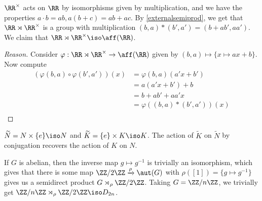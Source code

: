 \begin{ex}
$\RR^{\times}$ acts on $\RR$ by isomorphisms given by multiplication,
and we have the properties $a \cdot b = ab, a(b + c) = ab + ac$. By
\ref{externalsemiprod}, we get that $\RR \rtimes \RR^\times$ is a group
with multiplication $(b, a) * (b', a') = (b + ab', aa')$. We claim that
$\RR \rtimes \RR^\times \iso \aff(\RR)$.
\end{ex}

\begin{proof}[Reason]
Consider $\varphi : \RR \rtimes \RR^\times \to \aff(\RR)$ given by $(b, a)
\mapsto \lbrace x \mapsto ax + b \rbrace$. Now compute
\[ \begin{aligned}
(\varphi(b, a) \circ \varphi(b', a'))(x) &= \varphi(b, a)(a'x + b') \\
&= a(a'x + b') + b \\
&= b + ab' + aa'x \\
&= \varphi((b, a) * (b', a'))(x) \\
\end{aligned} \]
\end{proof}

\begin{rem}
$\widetilde{N} = N \times \lbrace e \rbrace \iso N$ and $\widetilde{K} =
\lbrace e \rbrace \times K \iso K$. The action of $\widetilde{K}$ on
$\widetilde{N}$ by conjugation recovers the action of $K$ on $N$.
\end{rem}

\begin{ex}
If $G$ is abelian, then the inverse map $g \mapsto g^{-1}$ is trivially
an isomorphism, which gives that there is some map $\ZZ / 2 \ZZ
\xrightarrow{\rho} \aut(G)$ with $\rho([1]) = \lbrace g \mapsto g^{-1}
\rbrace$ gives us a semidirect product $G \rtimes_\rho \ZZ / 2 \ZZ$.
Taking $G = \ZZ / n \ZZ$, we trivially get $\ZZ / n \ZZ \rtimes_\rho \ZZ
/ 2 \ZZ \iso D_{2n}$.
\end{ex}
